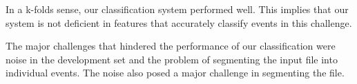 In a k-folds sense, our classification system performed well. This implies that our system
is not deficient in features that accurately classify events in this challenge. 

The major challenges that hindered the performance of our classification were noise in the 
development set and the problem of segmenting the input file into individual events. The 
noise also posed a major challenge in segmenting the file.

